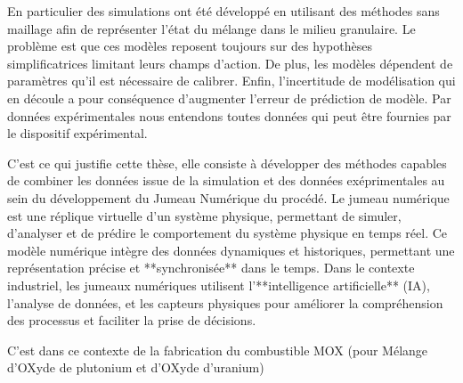 En particulier des simulations ont été développé en utilisant des méthodes sans maillage afin de représenter l'état du mélange dans le milieu granulaire.
Le problème est que ces modèles reposent toujours sur des hypothèses simplificatrices limitant leurs champs d'action. De plus, les modèles dépendent de paramètres qu'il est nécessaire de calibrer. Enfin, l'incertitude de modélisation qui en découle a pour conséquence d'augmenter l'erreur de prédiction de modèle.
Par données expérimentales nous entendons toutes données qui peut être fournies par le dispositif expérimental.

C'est ce qui justifie cette thèse, elle consiste à développer des méthodes capables de combiner les données issue de la simulation et des données exéprimentales au sein du développement du Jumeau Numérique du procédé. Le jumeau numérique est une réplique virtuelle d'un système physique, permettant de simuler, d'analyser et de prédire le comportement du système physique en temps réel. Ce modèle numérique intègre des données dynamiques et historiques, permettant une représentation précise et **synchronisée** dans le temps. Dans le contexte industriel, les jumeaux numériques utilisent l'**intelligence artificielle** (IA), l'analyse de données, et les capteurs physiques pour améliorer la compréhension des processus et faciliter la prise de décisions.


C'est dans ce contexte de la fabrication du combustible MOX (pour Mélange d’OXyde de plutonium et d’OXyde d’uranium)

